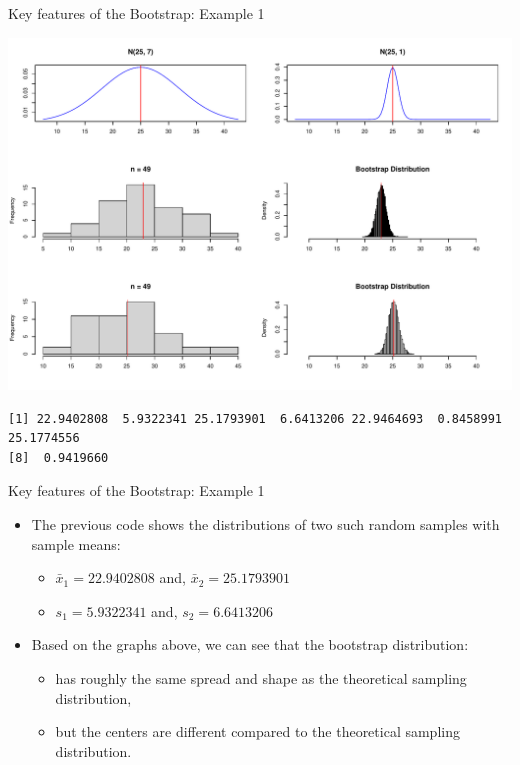 \documentclass[
  ignorenonframetext,
]{beamer}
\providecommand{\tightlist}{%
  \setlength{\itemsep}{0pt}\setlength{\parskip}{0pt}}
\begin{document}
\begin{frame}[fragile]{Key features of the Bootstrap: Example 1}
\protect\hypertarget{key-features-of-the-bootstrap-example-1-2}{}
\tiny

\begin{center}\includegraphics[width=0.9\linewidth,height=0.75\textheight]{Week10A_files/figure-beamer/unnamed-chunk-3-1} \end{center}

\begin{verbatim}
[1] 22.9402808  5.9322341 25.1793901  6.6413206 22.9464693  0.8458991 25.1774556
[8]  0.9419660
\end{verbatim}

\normalsize
\end{frame}

\begin{frame}{Key features of the Bootstrap: Example 1}
\protect\hypertarget{key-features-of-the-bootstrap-example-1-3}{}
\begin{itemize}
\item
  The previous code shows the distributions of two such random samples
  with sample means:

  \begin{itemize}
  \tightlist
  \item
    \(\bar{x}_1=22.9402808\) and, \(\bar{x}_2=25.1793901\)
  \item
    \(s_1= 5.9322341\) and, \(s_2= 6.6413206\)
  \end{itemize}
\item
  Based on the graphs above, we can see that the bootstrap distribution:

  \begin{itemize}
  \tightlist
  \item
    has roughly the same spread and shape as the theoretical sampling
    distribution,
  \item
    but the centers are different compared to the theoretical sampling
    distribution.
  \end{itemize}
\end{itemize}
\end{frame}
\end{document}
